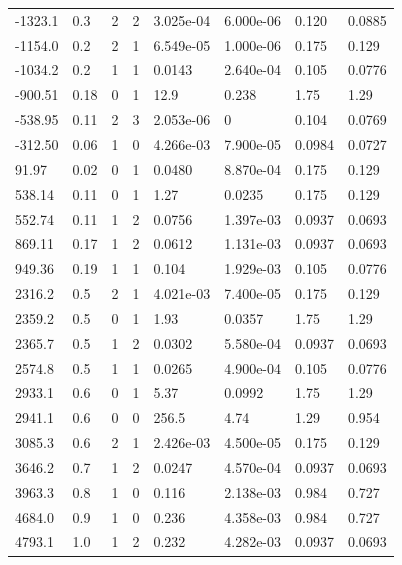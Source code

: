 \documentclass[preview]{standalone}
\begin{document}
{{\begin{tabular}{L{1.2cm}C{1.2cm} C{0.3cm}C{0.5cm} C{1.4cm}C{1.4cm} C{1.4cm}C{1.4cm}}
  -1323.1  &   0.3  & 2     &  2 &  3.025e-04  & 6.000e-06  & 0.120 &  0.0885   \\ 
  -1154.0  &   0.2  & 2     &  1 &  6.549e-05  & 1.000e-06  & 0.175 &  0.129   \\ 
  -1034.2  &   0.2  & 1     &  1 &  0.0143  & 2.640e-04  & 0.105 &  0.0776   \\ 
  -900.51  &  0.18  & 0     &  1 &  12.9  & 0.238  & 1.75 &  1.29   \\ 
  -538.95  &  0.11  & 2     &  3 &  2.053e-06  & 0  & 0.104 &  0.0769   \\ 
  -312.50  &  0.06  & 1     &  0 &  4.266e-03  & 7.900e-05  & 0.0984 &  0.0727   \\ 
  91.97  &  0.02  & 0     &  1 &  0.0480  & 8.870e-04  & 0.175 &  0.129   \\ 
  538.14  &  0.11  & 0     &  1 &  1.27  & 0.0235  & 0.175 &  0.129   \\ 
  552.74  &  0.11  & 1     &  2 &  0.0756  & 1.397e-03  & 0.0937 &  0.0693   \\ 
  869.11  &  0.17  & 1     &  2 &  0.0612  & 1.131e-03  & 0.0937 &  0.0693   \\ 
  949.36  &  0.19  & 1     &  1 &  0.104  & 1.929e-03  & 0.105 &  0.0776   \\ 
  2316.2  &   0.5  & 2     &  1 &  4.021e-03  & 7.400e-05  & 0.175 &  0.129   \\ 
  2359.2  &   0.5  & 0     &  1 &  1.93  & 0.0357  & 1.75 &  1.29   \\ 
  2365.7  &   0.5  & 1     &  2 &  0.0302  & 5.580e-04  & 0.0937 &  0.0693   \\ 
  2574.8  &   0.5  & 1     &  1 &  0.0265  & 4.900e-04  & 0.105 &  0.0776   \\ 
  2933.1  &   0.6  & 0     &  1 &  5.37  & 0.0992  & 1.75 &  1.29   \\ 
  2941.1  &   0.6  & 0     &  0 &  256.5  & 4.74  & 1.29 &  0.954   \\ 
  3085.3  &   0.6  & 2     &  1 &  2.426e-03  & 4.500e-05  & 0.175 &  0.129   \\ 
  3646.2  &   0.7  & 1     &  2 &  0.0247  & 4.570e-04  & 0.0937 &  0.0693   \\ 
  3963.3  &   0.8  & 1     &  0 &  0.116  & 2.138e-03  & 0.984 &  0.727   \\ 
  4684.0  &   0.9  & 1     &  0 &  0.236  & 4.358e-03  & 0.984 &  0.727   \\ 
  4793.1  &   1.0  & 1     &  2 &  0.232  & 4.282e-03  & 0.0937 &  0.0693   \\ 

\end{tabular}}}
\end{document}
